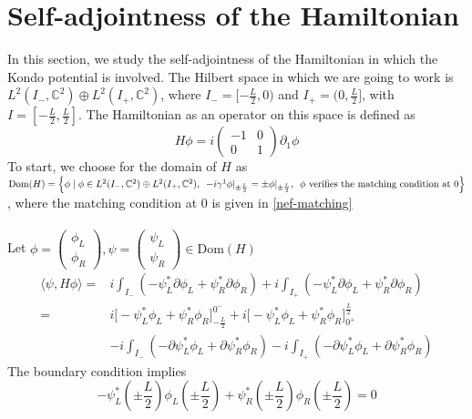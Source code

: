 \section{Self-adjointness of the Hamiltonian}
In this section, we study the self-adjointness of the Hamiltonian in which the Kondo potential is involved. The Hilbert space in which we are going to work is $L^{2}(I_-, \mathbb{C}^2) \oplus L^{2}(I_+, \mathbb{C}^2)$,  where $I_- = [-\frac{L}{2}, 0)$ and $I_+ = (0, \frac{L}{2}]$, with $I = [-\frac{L}{2}, \frac{L}{2}]$. The Hamiltonian as an operator on this space is defined as
\begin{equation}
H \phi = i \begin{pmatrix}
-1  &  0 \\
0  &  1  \end{pmatrix} \partial_1 \phi 
\end{equation}
To start, we choose for the domain of $H$ as 
$\mathrm{Dom}(H) = \Big \{\phi  \mid \phi \in L^{2}(I_-, \mathbb{C}^2) \oplus L^{2}(I_+, \mathbb{C}^2), \enskip -i \gamma^1 \phi\vert_{\pm \frac{L}{2}} = \pm \phi \vert_{ \pm \frac{L}{2} }, \enskip \phi \textrm{ verifies the matching condition at 0} \Big \}$, where the matching condition at 0 is given in \cref{nef-matching}\\\\
Let $ \phi = \begin{pmatrix} \phi_L \\ \phi_R \end{pmatrix}, \psi = \begin{pmatrix} \psi_L \\ \psi_R \end{pmatrix} \in \mathrm{Dom}(H)$
\begin{equation}\label{sa-hamiltonian}
\begin{split}
\langle \psi, H \phi \rangle = & i \int_{I_-} ( - \psi_L^* \partial \phi_L + \psi_R^* \partial \phi_R )
+ i \int_{I_+} ( - \psi_L^* \partial \phi_L + \psi_R^* \partial \phi_R ) \\
= & i \big[-\psi_L^* \phi_L + \psi_R^* \phi_R \big]^{0^-}_{-\frac{L}{2}} + i \big[-\psi_L^* \phi_L + \psi_R^* \phi_R \big]_{0^+}^{\frac{L}{2}} \\
& - i \int_{I_-} ( - \partial \psi_L^* \phi_L + \partial \psi_R^*  \phi_R ) - i \int_{I_+} ( - \partial \psi_L^* \phi_L + \partial \psi_R^*  \phi_R ) 
\end{split}
\end{equation}
The boundary condition implies
\begin{equation*}
- \psi_L^*(\pm \frac{L}{2}) \phi_L(\pm \frac{L}{2}) + \psi_R^*(\pm \frac{L}{2}) \phi_R(\pm \frac{L}{2}) =0
\end{equation*}
